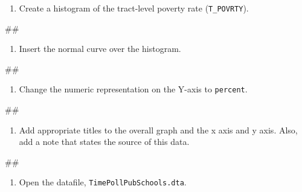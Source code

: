 \documentclass[
]{book}
\newenvironment{Shaded}{\begin{snugshade}}{\end{snugshade}}
\newcommand{\NormalTok}[1]{#1}
\providecommand{\tightlist}{%
  \setlength{\itemsep}{0pt}\setlength{\parskip}{0pt}}
\begin{document}
\begin{enumerate}
\def\labelenumi{\arabic{enumi}.}
\setcounter{enumi}{1}
\tightlist
\item
  Create a histogram of the tract-level poverty rate (\texttt{T\_POVRTY}).
\end{enumerate}

\begin{Shaded}
\begin{Highlighting}[]
\NormalTok{\#\#}
\end{Highlighting}
\end{Shaded}

\begin{enumerate}
\def\labelenumi{\arabic{enumi}.}
\setcounter{enumi}{2}
\tightlist
\item
  Insert the normal curve over the histogram.
\end{enumerate}

\begin{Shaded}
\begin{Highlighting}[]
\NormalTok{\#\#}
\end{Highlighting}
\end{Shaded}

\begin{enumerate}
\def\labelenumi{\arabic{enumi}.}
\setcounter{enumi}{3}
\tightlist
\item
  Change the numeric representation on the Y-axis to \texttt{percent}.
\end{enumerate}

\begin{Shaded}
\begin{Highlighting}[]
\NormalTok{\#\#}
\end{Highlighting}
\end{Shaded}

\begin{enumerate}
\def\labelenumi{\arabic{enumi}.}
\setcounter{enumi}{4}
\tightlist
\item
  Add appropriate titles to the overall graph and the x axis and y axis. Also, add a note that states the source of this data.
\end{enumerate}

\begin{Shaded}
\begin{Highlighting}[]
\NormalTok{\#\#}
\end{Highlighting}
\end{Shaded}

\begin{enumerate}
\def\labelenumi{\arabic{enumi}.}
\setcounter{enumi}{5}
\tightlist
\item
  Open the datafile, \texttt{TimePollPubSchools.dta}.
\end{enumerate}
\end{document}
